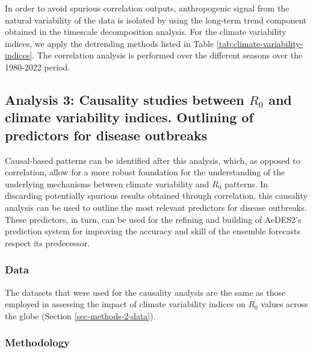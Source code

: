 \documentclass[
	a4paper, %
	8pt, %
	unnumberedsections, %
	twoside, %
]{LTJournalArticle}
\begin{document}
  In order to avoid spurious correlation outputs, anthropogenic signal from the natural variability of the data is isolated by using the long-term trend component obtained in the timescale decomposition analysis. For the climate variability indices, we apply the detrending methods listed in Table \ref{tab:climate-variability-indices}. The correlation analysis is performed over the different seasons over the 1980-2022 period.

  \subsection{Analysis 3: Causality studies between $R_0$ and climate variability indices. Outlining of predictors for disease outbreaks} \label{sec-methods-3}

  Causal-based patterns can be identified after this analysis, which, as opposed to correlation, allow for a more robust foundation for the understanding of the underlying mechanisms between climate variability and $R_0$ patterns. In discarding potentially spurious results obtained through correlation, this causality analysis can be used to outline the most relevant predictors for disease outbreaks. These predictors, in turn, can be used for the refining and building of AeDES2's prediction system for improving the accuracy and skill of the ensemble forecasts respect its predecessor.

  \subsubsection{Data} \label{sec-methods-3-data}

  The datasets that were used for the causality analysis are the same as those employed in assessing the impact of climate variability indices on $R_0$ values across the globe (Section \ref{sec-methods-2-data}).

  \subsubsection{Methodology} \label{sec-methods-3-methodology}
\end{document}
